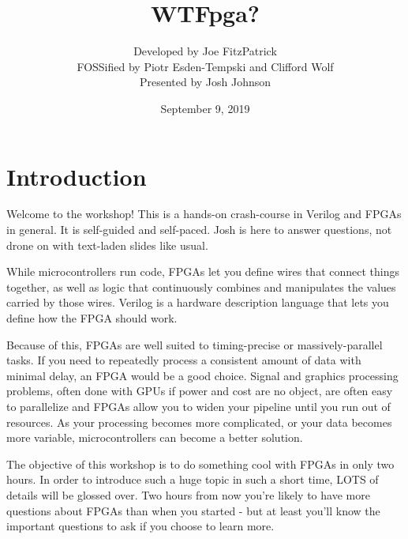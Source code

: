 \documentclass[12pt,a4paper]{article}
\date{September 9, 2019}
\title{WTFpga?}
\author{{Developed by Joe FitzPatrick} \\
		{FOSSified by Piotr Esden-Tempski and Clifford Wolf}\\
		{Presented by Josh Johnson}}
\begin{document}
\begin{titlingpage}
    \maketitle
\end{titlingpage}

\newpage

\section{Introduction}
Welcome to the workshop! This is a hands-on crash-course in Verilog and FPGAs in general. It is self-guided and self-paced. Josh is here to answer questions, not drone on with text-laden slides like usual.

While microcontrollers run code, FPGAs let you define wires that connect things together, as well as logic that continuously combines and manipulates the values carried by those wires. Verilog is a hardware description language
that lets you define how the FPGA should work. 

Because of this, FPGAs are well suited to timing-precise or massively-parallel tasks. If you need to repeatedly process a consistent amount of data with minimal delay, an FPGA would be a good choice. Signal and graphics processing problems, often done with GPUs if power and cost are no object, are often easy to parallelize and FPGAs allow you to widen your pipeline until you run out of resources. As your processing becomes more complicated, or your data becomes more variable, microcontrollers can become a
better solution.

The objective of this workshop is to do something cool with FPGAs in only two hours. In order to introduce such a huge topic in such a short time, LOTS of details will be glossed over. Two hours from now you’re likely to have more questions about FPGAs than when you started - but at least you’ll know the important questions to ask if you choose to learn more.
\end{document}
